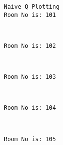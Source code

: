 \documentclass[11pt]{article}
\begin{document}
    \begin{Verbatim}[commandchars=\\\{\}]
Naive Q Plotting
Room No is: 101

    \end{Verbatim}

    \begin{center}
    \end{center}
    { \hspace*{\fill} \\}
    
    \begin{Verbatim}[commandchars=\\\{\}]
Room No is: 102

    \end{Verbatim}

    \begin{center}
    \end{center}
    { \hspace*{\fill} \\}
    
    \begin{Verbatim}[commandchars=\\\{\}]
Room No is: 103

    \end{Verbatim}

    \begin{center}
    \end{center}
    { \hspace*{\fill} \\}
    
    \begin{Verbatim}[commandchars=\\\{\}]
Room No is: 104

    \end{Verbatim}

    \begin{center}
    \end{center}
    { \hspace*{\fill} \\}
    
    \begin{Verbatim}[commandchars=\\\{\}]
Room No is: 105

    \end{Verbatim}
\end{document}

